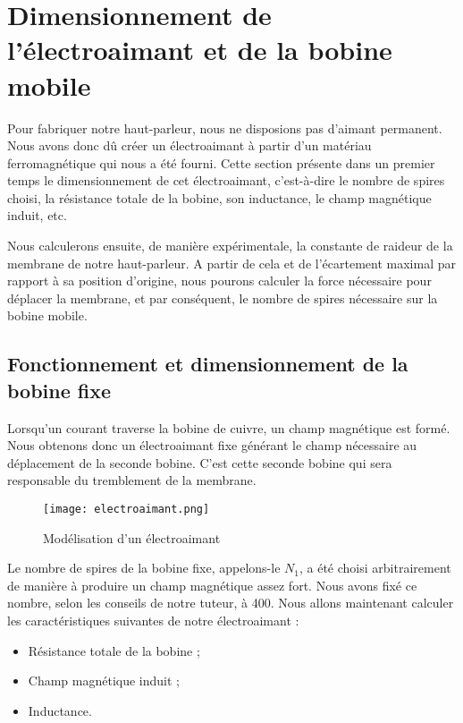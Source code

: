 

\section{Dimensionnement de l'électroaimant et de la bobine mobile}
Pour fabriquer notre haut-parleur, nous ne disposions pas d'aimant permanent. Nous avons donc
dû créer un électroaimant à partir d'un matériau ferromagnétique qui nous a été fourni.
Cette section présente dans un premier temps le dimensionnement de cet électroaimant, c'est-à-dire le
nombre de spires choisi, la résistance totale de la bobine, son inductance, le champ magnétique
induit, etc.

Nous calculerons ensuite, de manière expérimentale, la constante de raideur de la membrane de
notre haut-parleur. A partir de cela et de l'écartement maximal par rapport à sa position d'origine, 
nous pourons calculer la force nécessaire pour déplacer la membrane, et par conséquent, le nombre
de spires nécessaire sur la bobine mobile.

\subsection{Fonctionnement et dimensionnement de la bobine fixe}
Lorsqu'un courant traverse la bobine de cuivre, un champ magnétique est formé.  Nous obtenons 
donc un électroaimant fixe générant le champ nécessaire au déplacement de la seconde bobine. 
C'est cette seconde bobine qui sera responsable du tremblement de la membrane.

\begin{figure}[h]
\centering
\texttt{[image: electroaimant.png]}
\caption{Modélisation d'un électroaimant}
\label{modélisation de l'électroaimant}
\end{figure}

Le nombre de spires de la bobine fixe, appelons-le $N_1$, a été choisi arbitrairement de manière à produire un
champ magnétique assez fort. Nous avons fixé ce nombre, selon les conseils de notre tuteur, à 400. 
Nous allons maintenant calculer les caractéristiques suivantes de notre électroaimant :

\begin{itemize}
	\item Résistance totale de la bobine ;
	\item Champ magnétique induit ;
	\item Inductance.
\end{itemize}

